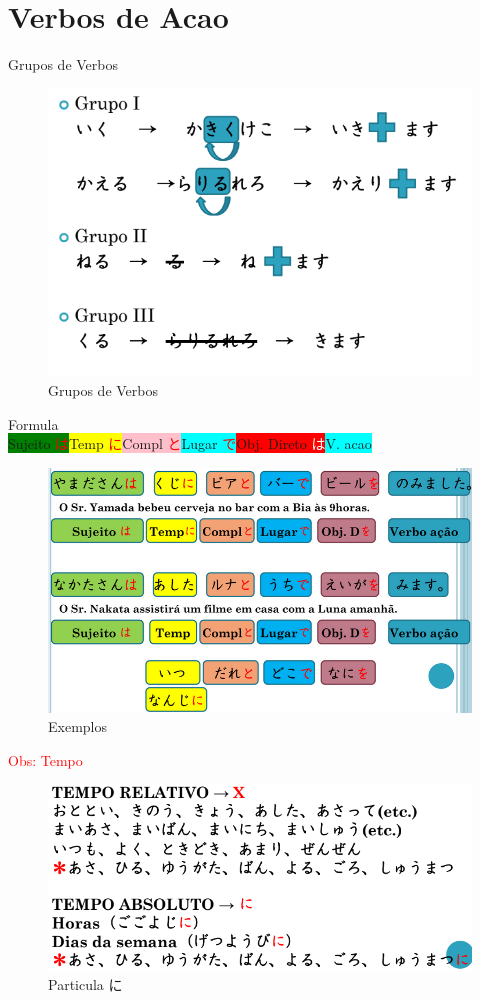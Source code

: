 \documentclass[a4paper, 12pt]{article}
\begin{document}
\newpage
\section{Verbos de Acao}
	\begin{CJK}{UTF8}{min}
		\Large
		Grupos de Verbos\\
		\normalsize
		\begin{figure}[h]
			\centering
			\includegraphics[width=0.8\linewidth]{Imagens/grupos_verbos}
			\caption{Grupos de Verbos}
			\label{fig:gruposverbos}
		\end{figure}
	
		\Large
		Formula \\
		\normalsize
		\colorbox{green}{Sujeito \textcolor{red}{は}}\colorbox{yellow}{Temp \textcolor{red}{に}}\colorbox{pink}{Compl \textcolor{red}{と}}\colorbox{cyan}{Lugar \textcolor{red}{で}}\colorbox{red}{Obj. Direto \textcolor{white}{は}}\colorbox{cyan}{V. acao}
		\begin{figure}[h]
			\centering
			\includegraphics[width=0.8\linewidth]{Imagens/vacao}
			\caption{Exemplos}
			\label{fig:vacao}
		\end{figure}
		
		\newpage
		\Large
		\textcolor{red}{Obs: Tempo}
		\normalsize
			\begin{figure}[h]
				\centering
				\includegraphics[width=0.85\linewidth]{Imagens/tempo}
				\caption{Particula に}
				\label{fig:tempo}
			\end{figure}
		

\end{CJK}
\end{document}

